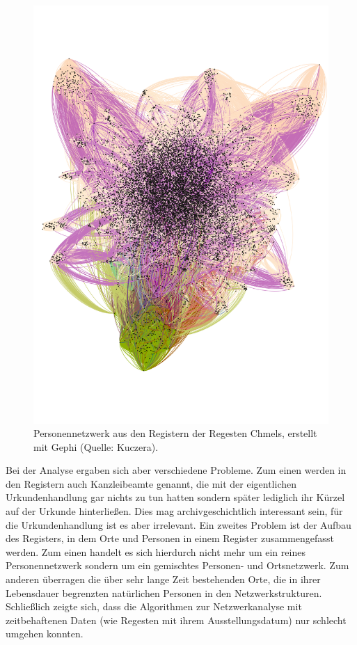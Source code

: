 \documentclass[ngerman,]{scrreprt}
\begin{document}
\begin{figure}
\centering
\includegraphics{Bilder/Chmelvisualisierung-v2.png}
\caption{Personennetzwerk aus den Registern der Regesten Chmels, erstellt mit Gephi (Quelle: Kuczera).}
\end{figure}

Bei der Analyse ergaben sich aber verschiedene Probleme. Zum einen werden in den Registern auch Kanzleibeamte genannt, die mit der eigentlichen Urkundenhandlung gar nichts zu tun hatten sondern später lediglich ihr Kürzel auf der Urkunde hinterließen. Dies mag archivgeschichtlich interessant sein, für die Urkundenhandlung ist es aber irrelevant. Ein zweites Problem ist der Aufbau des Registers, in dem Orte und Personen in einem Register zusammengefasst werden. Zum einen handelt es sich hierdurch nicht mehr um ein reines Personennetzwerk sondern um ein gemischtes Personen- und Ortsnetzwerk. Zum anderen überragen die über sehr lange Zeit bestehenden Orte, die in ihrer Lebensdauer begrenzten natürlichen Personen in den Netzwerkstrukturen. Schließlich zeigte sich, dass die Algorithmen zur Netzwerkanalyse mit zeitbehaftenen Daten (wie Regesten mit ihrem Ausstellungsdatum) nur schlecht umgehen konnten.
\end{document}
